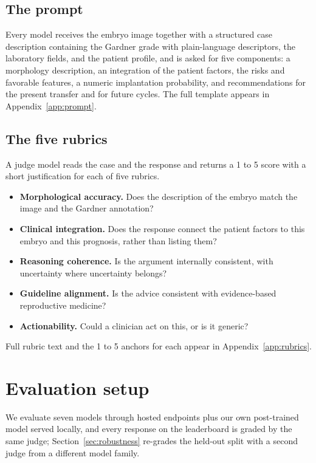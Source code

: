 \documentclass[11pt]{article}
\begin{document}
\subsection{The prompt}

Every model receives the embryo image together with a structured case
description containing the Gardner grade with plain-language descriptors, the
laboratory fields, and the patient profile, and is asked for five components: a
morphology description, an integration of the patient factors, the risks and
favorable features, a numeric implantation probability, and recommendations for
the present transfer and for future cycles. The full template appears in
Appendix~\ref{app:prompt}.

\subsection{The five rubrics}

A judge model reads the case and the response and returns a 1 to 5 score with a
short justification for each of five rubrics.

\begin{itemize}
\item \textbf{Morphological accuracy.} Does the description of the embryo match the
      image and the Gardner annotation?
\item \textbf{Clinical integration.} Does the response connect the patient factors
      to this embryo and this prognosis, rather than listing them?
\item \textbf{Reasoning coherence.} Is the argument internally consistent, with
      uncertainty where uncertainty belongs?
\item \textbf{Guideline alignment.} Is the advice consistent with evidence-based
      reproductive medicine?
\item \textbf{Actionability.} Could a clinician act on this, or is it
      generic?
\end{itemize}

Full rubric text and the 1 to 5 anchors for each appear in
Appendix~\ref{app:rubrics}.

\section{Evaluation setup}
\label{sec:setup}


We evaluate seven models through hosted endpoints plus our own post-trained
model served locally, and every response on the leaderboard is graded by the same
judge; Section~\ref{sec:robustness} re-grades the held-out split with a second
judge from a different model family.
\end{document}

